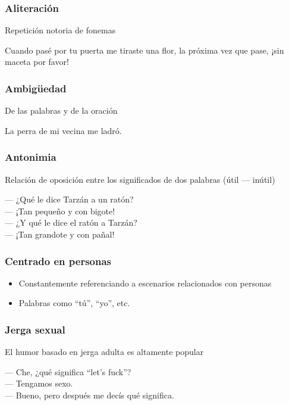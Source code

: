 \begin{frame}
    \frametitle{Aliteración}

    Repetición notoria de fonemas

    \begin{example}
        Cuando pasé por tu puerta me tiraste una flor, la próxima vez que pase, ¡sin maceta por favor!
    \end{example}
\end{frame}

\begin{frame}
    \frametitle{Ambigüedad}
    
    De las palabras y de la oración

    \begin{example}
        La perra de mi vecina me ladró.
    \end{example}
\end{frame}

\begin{frame}
    \frametitle{Antonimia}
    
    Relación de oposición entre los significados de dos palabras (útil --- inútil)

    \begin{example}
        --- ¿Qué le dice Tarzán a un ratón? \\
        --- ¡Tan pequeño y con bigote! \\
        --- ¿Y qué le dice el ratón a Tarzán? \\
        --- ¡Tan grandote y con pañal! \\
    \end{example}
\end{frame}

\begin{frame}
    \frametitle{Centrado en personas}
    
    \begin{itemize}
        \item Constantemente referenciando a escenarios relacionados con personas
        \item Palabras como “tú”, “yo”, etc.
    \end{itemize}
\end{frame}

\begin{frame}
    \frametitle{Jerga sexual}
    
    El humor basado en jerga adulta es altamente popular

    \begin{example}
        --- Che, ¿qué significa “let’s fuck”? \\
        --- Tengamos sexo. \\
        --- Bueno, pero después me decís qué significa.
    \end{example}
\end{frame}

